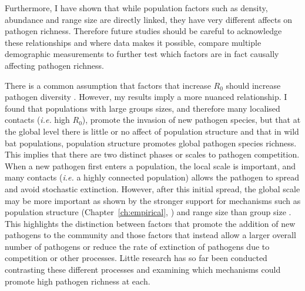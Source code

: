 Furthermore, I have shown that while population factors such as density, abundance and range size are directly linked, they have very different affects on pathogen richness.
Therefore future studies should be careful to acknowledge these relationships and where data makes it possible, compare multiple demographic measurements to further test which factors are in fact causally affecting pathogen richness.








There is a common assumption that factors that increase $R_0$ should increase pathogen diversity \cite{nunn2003comparative, morand2000wormy}.
However, my results imply a more nuanced relationship. 
I found that populations with large groups sizes, and therefore many localised contacts (\emph{i.e.} high $R_0$), promote the invasion of new pathogen species, but that at the global level there is little or no affect of population structure and that in wild bat populations, population structure promotes global pathogen species richness.
This implies that there are two distinct phases or scales to pathogen competition.
When a new pathogen first enters a population, the local scale is important, and many contacts (\emph{i.e.} a highly connected population) allows the pathogen to spread and avoid stochastic extinction.
However, after this initial spread, the global scale may be more important as  shown by the stronger support for mechanisms such as population structure (Chapter~\ref{ch:empirical}, \textcite{turmelle2009correlates, maganga2014bat}) and range size \cite{kamiya2014determines, nunn2003comparative} than group size \cite{rifkin2012animals, ezenwa2006host}.
This highlights the distinction between factors that promote the addition of new pathogens to the community and those factors that instead allow a larger overall number of pathogens or reduce the rate of extinction of pathogens due to competition or other processes.
Little research has so far been conducted contrasting these different processes and examining which mechanisms could promote high pathogen richness at each.

